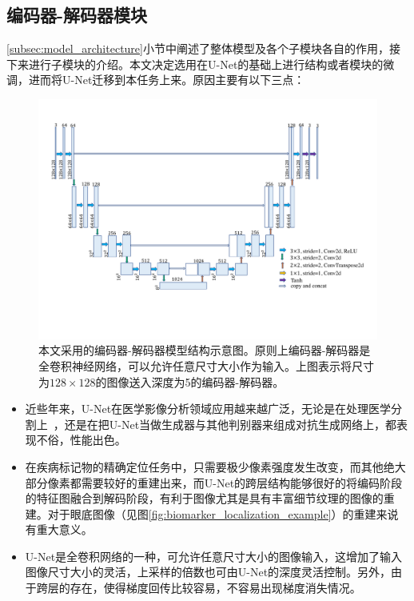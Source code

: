 \subsection{编码器-解码器模块}\label{subsec:encoder_decoder_model}
\ref{subsec:model_architecture}小节中阐述了整体模型及各个子模块各自的作用，接下来进行子模块的介绍。本文决定选用在U-Net的基础上进行结构或者模块的微调，进而将U-Net迁移到本任务上来。原因主要有以下三点：
\begin{figure}[h]
	\centering
	\includegraphics[width=1.0\textwidth]{figure/auto_encoder_architecture}
	\caption{本文采用的编码器-解码器模型结构示意图。原则上编码器-解码器是全卷积神经网络，可以允许任意尺寸大小作为输入。上图表示将尺寸为$128\times 128$的图像送入深度为5的编码器-解码器。}
	\label{fig:auto_encoder_architecture}
\end{figure}
\begin{itemize}
	\item 近些年来，U-Net在医学影像分析领域应用越来越广泛，无论是在处理医学分割上~\cite{oktay2018attention, dong2017automatic, zhang2018ct}，还是在把U-Net当做生成器与其他判别器来组成对抗生成网络上，都表现不俗，性能出色。
	\item 在疾病标记物的精确定位任务中，只需要极少像素强度发生改变，而其他绝大部分像素都需要较好的重建出来，而U-Net的跨层结构能够很好的将编码阶段的特征图融合到解码阶段，有利于图像尤其是具有丰富细节纹理的图像的重建。对于眼底图像（见图\ref{fig:biomarker_localization_example}）的重建来说有重大意义。
	\item U-Net是全卷积网络的一种，可允许任意尺寸大小的图像输入，这增加了输入图像尺寸大小的灵活，上采样的倍数也可由U-Net的深度灵活控制。另外，由于跨层的存在，使得梯度回传比较容易，不容易出现梯度消失情况。
\end{itemize}
